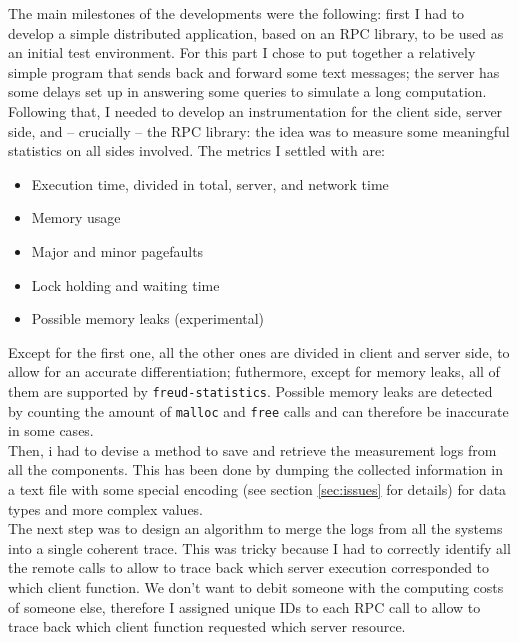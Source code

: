         The main milestones of the developments were the following: first I had to develop a
        simple distributed application, based on an RPC library, to be used as an initial test environment.
        For this part I chose to put together a relatively simple program that sends back and forward
        some text messages; the server has some delays set up in answering some queries to simulate a
        long computation.\\

        Following that, I needed to develop an instrumentation for the client side, server side,
        and – crucially – the RPC library:
        the idea was to measure some meaningful statistics on all sides involved. 
        The metrics I settled with are:

        \begin{itemize}
            \item Execution time, divided in total, server, and network time
            \item Memory usage
            \item Major and minor pagefaults
            \item Lock holding and waiting time
            \item Possible memory leaks (experimental)
        \end{itemize}

        Except for the first one, all the other ones are divided in client and server side, to allow for an
        accurate differentiation; futhermore, except for memory leaks, all of them are supported by 
        \texttt{freud-statistics}. Possible memory leaks are detected by counting the amount of \texttt{malloc}
        and \texttt{free} calls and can therefore be inaccurate in some cases.\\

        Then, i had to devise a method to save and retrieve the measurement logs from all the components.
        This has been done by dumping the collected information in a text file with some special encoding
        (see section \ref{sec:issues} for details) for data types and more complex values.\\

        The next step was to design an algorithm to merge the logs from all the systems into a single
        coherent trace. This was tricky because I had to correctly identify all the remote calls to allow
        to trace back which server execution corresponded to which client function. We don't want to debit
        someone with the computing costs of someone else, therefore I assigned unique IDs to each
        RPC call to allow to trace back which client function requested which server resource.\\

